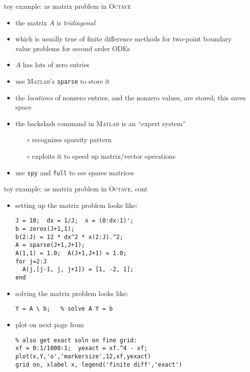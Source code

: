 \documentclass[10pt,hyperref]{beamer}
\newcommand{\Matlab}{\textsc{Matlab}\xspace}
\newcommand{\Octave}{\textsc{Octave}\xspace}
\begin{document}
\begin{frame}{toy example: as matrix problem in \Octave} 

\begin{itemize}
\item the matrix $A$ is \emph{tridiagonal}
\item which is usually true of finite difference methods for two-point boundary value problems for second order ODEs
\item $A$ has lots of zero entries
\item use \Matlab's \texttt{sparse} to store it
\item the \emph{locations} of nonzero entries, and the nonzero values, are stored; this saves space
\item the backslash command in \Matlab is an ``expert system''
  \begin{itemize}
  \item[$\circ$] recognizes sparsity pattern
  \item[$\circ$] exploits it to speed up matrix/vector operations
  \end{itemize}
\item use \texttt{spy} and \texttt{full} to see sparse matrices
\end{itemize}
\end{frame}


\begin{frame}[fragile]{toy example: as matrix problem in \Octave, cont} 

\begin{itemize}
\item setting up the matrix problem looks like:
\small
\begin{verbatim}
J = 10;  dx = 1/J;  x = (0:dx:1)';
b = zeros(J+1,1);
b(2:J) = 12 * dx^2 * x(2:J).^2;
A = sparse(J+1,J+1);
A(1,1) = 1.0;  A(J+1,J+1) = 1.0;
for j=2:J
  A(j,[j-1, j, j+1]) = [1, -2, 1];
end
\end{verbatim}
\normalsize
\item solving the matrix problem looks like:
\small
\begin{verbatim}
Y = A \ b;   % solve A Y = b
\end{verbatim}
\normalsize
\item plot on next page from 
\small
\begin{verbatim}
% also get exact soln on fine grid:
xf = 0:1/1000:1;  yexact = xf.^4 - xf;
plot(x,Y,'o','markersize',12,xf,yexact)
grid on, xlabel x, legend('finite diff','exact')
\end{verbatim}
\end{itemize}
\end{frame}
\end{document}
